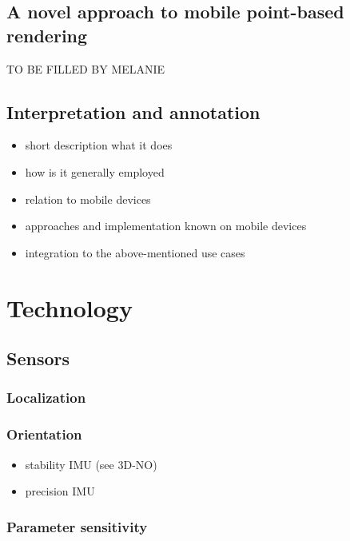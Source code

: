 \documentclass[review]{elsarticle}
\begin{document}
\subsection{A novel approach to mobile point-based rendering}

TO BE FILLED BY MELANIE

\subsection{Interpretation and annotation}

\begin{itemize}
\item short description what it does
\item how is it generally employed
\item relation to mobile devices
\item approaches and implementation known on mobile devices
\item integration to the above-mentioned use cases
\end{itemize}



\section{Technology}
\label{sec:technology}

\subsection{Sensors}

\subsubsection{Localization}

\subsubsection{Orientation}

\begin{itemize}
\item stability IMU (see 3D-NO)
\item precision IMU
\end{itemize}

\subsubsection{Parameter sensitivity}
\end{document}
